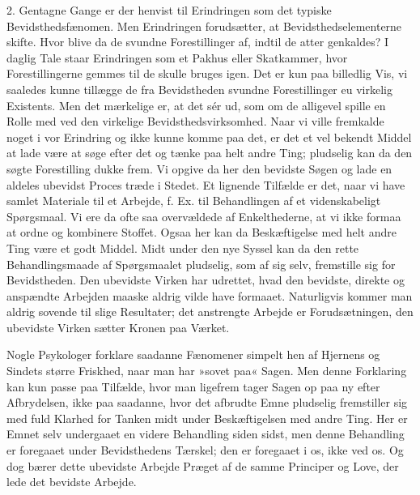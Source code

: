 \documentclass[12pt,a4paper,openany]{book}
\newcommand{\opage}[1]{\marginnote{\footnotesize\textit{[#1]}}}
\begin{document}
2. Gentagne Gange er der henvist til Erindringen som det typiske
Bevidsthedsfænomen. Men Erindringen forudsætter, at
Bevidsthedselementerne skifte. Hvor blive da de svundne Forestillinger
af, indtil de atter genkaldes? I daglig Tale staar Erindringen som et
Pakhus eller Skatkammer, hvor Forestillingerne gemmes til de skulle
bruges igen. Det er kun paa billedlig Vis, vi saaledes kunne tillægge de
fra Bevidstheden svundne Forestillinger eu virkelig Existents. Men det
mærkelige er, at det sér ud, som om de alligevel spille en Rolle med ved
den virkelige Bevidsthedsvirksomhed. Naar vi ville fremkalde noget i vor
Erindring og ikke kunne komme paa det, er det et vel bekendt Middel at
lade være at søge efter det og tænke paa helt andre Ting; pludselig kan
da den søgte Forestilling dukke frem. Vi opgive da her den bevidste
Søgen og lade en aldeles ubevidst Proces træde i Stedet. Et lignende
Tilfælde er det, naar vi have samlet Materiale til et Arbejde, f. Ex.
til Behandlingen af et videnskabeligt Spørgsmaal. Vi ere da ofte saa
overvældede af Enkelthederne, at vi ikke formaa at ordne og kombinere
Stoffet. Ogsaa her kan da
\opage{88}Beskæftigelse med helt andre Ting være et godt Middel. Midt
under den nye Syssel kan da den rette Behandlingsmaade af Spørgsmaalet
pludselig, som af sig selv, fremstille sig for Bevidstheden. Den
ubevidste Virken har udrettet, hvad den bevidste, direkte og anspændte
Arbejden maaske aldrig vilde have formaaet. Naturligvis kommer man
aldrig sovende til slige Resultater; det anstrengte Arbejde er
Forudsætningen, den ubevidste Virken sætter Kronen paa Værket.

Nogle Psykologer forklare saadanne Fænomener simpelt hen af Hjernens og
Sindets større Friskhed, naar man har »sovet paa« Sagen. Men denne
Forklaring kan kun passe paa Tilfælde, hvor man ligefrem tager Sagen op
paa ny efter Afbrydelsen, ikke paa saadanne, hvor det afbrudte Emne
pludselig fremstiller sig med fuld Klarhed for Tanken midt under
Beskæftigelsen med andre Ting. Her er Emnet selv undergaaet en videre
Behandling siden sidst, men denne Behandling er foregaaet under
Bevidsthedens Tærskel; den er foregaaet i os, ikke ved os. Og dog bærer
dette ubevidste Arbejde Præget af de samme Principer og Love, der lede
det bevidste Arbejde.
\end{document}
